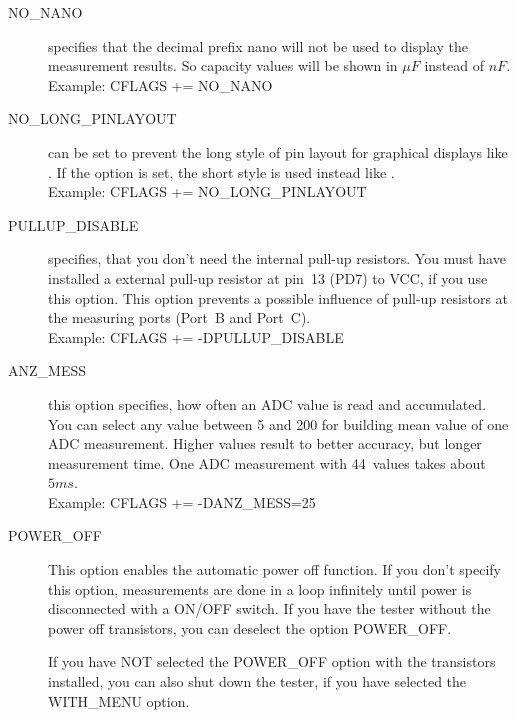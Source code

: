 \begin{description}
  \item[NO\_NANO] specifies that the decimal prefix nano will not be used to display the measurement results.
So capacity values will be shown in \(\mu F\) instead of \(nF\).\\
Example: CFLAGS += NO\_NANO

  \item[NO\_LONG\_PINLAYOUT] can be set to prevent the long style of pin layout for graphical displays 
  like .
If the option is set, the short style is used instead like .\\
Example: CFLAGS += NO\_LONG\_PINLAYOUT

\item[PULLUP\_DISABLE] specifies, that you don't need the internal pull-up resistors.
 You must have installed a external pull-up resistor at pin~13 (PD7) to VCC, if you use this option.
This option prevents a possible influence of pull-up resistors at the measuring ports (Port~B and Port~C).\\
Example: CFLAGS += -DPULLUP\_DISABLE

  \item[ANZ\_MESS] this option specifies, how often an ADC value is read and accumulated.
You can select any value between 5 and 200 for building mean value of one ADC measurement.
Higher values result to better accuracy, but  longer measurement time.
One ADC measurement with 44~values takes about \(5ms\).\\
Example: CFLAGS += -DANZ\_MESS=25

  \item[POWER\_OFF] This option enables the automatic power off function. If you don't specify this option,
 measurements are done in a loop infinitely  until power is disconnected with a ON/OFF switch.
If you have the tester without the power off transistors, you can deselect the option POWER\_OFF.

If you have NOT selected the POWER\_OFF option with the transistors installed,
you can also shut down the tester, if you have selected the WITH\_MENU option.


\end{description}
